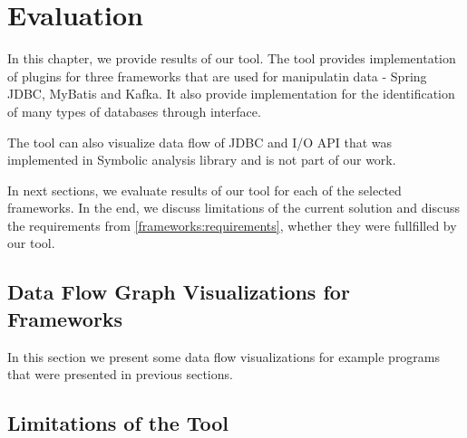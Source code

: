 
\chapter{Evaluation \label{chapter:results}}

In this chapter, we provide results of our \ToolName tool.
The tool provides implementation of plugins for three frameworks
that are used for manipulatin data - Spring JDBC, MyBatis and Kafka.
It also provide implementation for the identification of many types of databases
through  interface.

The \ToolName tool can also visualize data flow of JDBC and I/O API that was
implemented in Symbolic analysis library and is not part of our work.

In next sections, we evaluate results of our \ToolName tool for each of the selected frameworks.
In the end, we discuss limitations of the current solution and discuss
the requirements from \ref{frameworks:requirements}, whether they were
fullfilled by our \ToolName tool.




\section{Data Flow Graph Visualizations for Frameworks}

In this section we present some data flow visualizations
for example programs that were presented in previous sections.




\section{Limitations of the \ToolName Tool \label{chapter:results:limits}}


